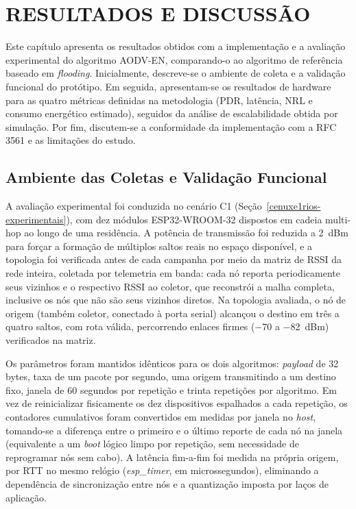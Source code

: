 \chapter{RESULTADOS E DISCUSSÃO}\label{cap:resultados}\label{resultados-e-discussuxe3o}

Este capítulo apresenta os resultados obtidos com a implementação e a
avaliação experimental do algoritmo AODV-EN, comparando-o ao algoritmo
de referência baseado em \emph{flooding}. Inicialmente, descreve-se o
ambiente de coleta e a validação funcional do protótipo. Em seguida,
apresentam-se os resultados de hardware para as quatro métricas
definidas na metodologia (PDR, latência, NRL e consumo energético
estimado), seguidos da análise de escalabilidade obtida por simulação.
Por fim, discutem-se a conformidade da implementação com a RFC 3561 e as
limitações do estudo.

\section{Ambiente das Coletas e Validação
Funcional}\label{ambiente-das-coletas-e-validauxe7uxe3o-funcional}

A avaliação experimental foi conduzida no cenário C1
(Seção~\ref{cenuxe1rios-experimentais}), com dez módulos ESP32-WROOM-32
dispostos em cadeia multi-hop ao longo de uma residência. A potência de
transmissão foi reduzida a 2~dBm para forçar a formação de múltiplos
saltos reais no espaço disponível, e a topologia foi verificada antes de
cada campanha por meio da matriz de RSSI da rede inteira, coletada por
telemetria em banda: cada nó reporta periodicamente seus vizinhos e o
respectivo RSSI ao coletor, que reconstrói a malha completa, inclusive os
nós que não são seus vizinhos diretos. Na topologia avaliada, o nó de
origem (também coletor, conectado à porta serial) alcançou o destino em
três a quatro saltos, com rota válida, percorrendo enlaces firmes
(−70 a −82~dBm) verificados na matriz.

Os parâmetros foram mantidos idênticos para os dois algoritmos:
\emph{payload} de 32 bytes, taxa de um pacote por segundo, uma origem
transmitindo a um destino fixo, janela de 60 segundos por repetição e
trinta repetições por algoritmo. Em vez de reinicializar fisicamente os
dez dispositivos espalhados a cada repetição, os contadores cumulativos
foram convertidos em medidas por janela no \emph{host}, tomando-se a
diferença entre o primeiro e o último reporte de cada nó na janela
(equivalente a um \emph{boot} lógico limpo por repetição, sem necessidade
de reprogramar nós sem cabo). A latência fim-a-fim foi medida na própria
origem, por RTT no mesmo relógio (\emph{esp\_timer}, em microssegundos),
eliminando a dependência de sincronização entre nós e a quantização
imposta por laços de aplicação.

